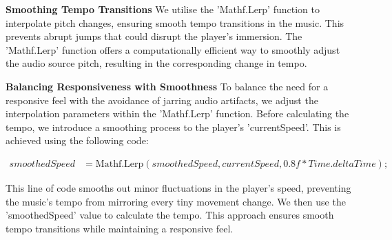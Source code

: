 \documentclass{l4proj}
\begin{document}
\textbf{Smoothing Tempo Transitions}\newline
We utilise the 'Mathf.Lerp' function to interpolate pitch changes, ensuring smooth tempo transitions in the music. This prevents abrupt jumps that could disrupt the player's immersion. The 'Mathf.Lerp' function offers a computationally efficient way to smoothly adjust the audio source pitch, resulting in the corresponding change in tempo.

\textbf{Balancing Responsiveness with Smoothness}\newline
To balance the need for a responsive feel with the avoidance of jarring audio artifacts, we adjust the interpolation parameters within the 'Mathf.Lerp' function. Before calculating the tempo, we introduce a smoothing process to the player's 'currentSpeed'. This is achieved using the following code:

\begin{align*}
smoothedSpeed &= \text{Mathf.Lerp}(smoothedSpeed, currentSpeed, 0.8f * Time.deltaTime);
\end{align*}

This line of code smooths out minor fluctuations in the player's speed, preventing the music's tempo from mirroring every tiny movement change. We then use the 'smoothedSpeed' value to calculate the tempo. This approach ensures smooth tempo transitions while maintaining a responsive feel.








\end{document}
